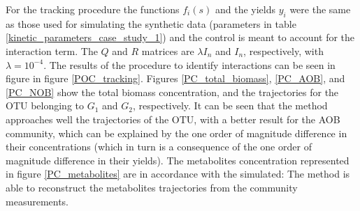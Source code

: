 \documentclass[3p,times]{article}
\begin{document}
 For the tracking procedure the functions $f_i(s)$ and the yields $y_i$ were the same as those used for simulating the synthetic data (parameters in table \ref{kinetic_parameters_case_study_1}) and the control is meant to account for the interaction term. The $Q$ and $R$ matrices are $\lambda I_n$ and $I_n$, respectively, with $\lambda = 10^{-4}$. The results of the procedure to identify interactions can be seen in figure in figure \ref{POC_tracking}. Figures \ref{PC_total_biomass}, \ref{PC_AOB}, and \ref{PC_NOB} show the total biomass concentration, and the trajectories for the OTU belonging to $G_1$ and $G_2$, respectively. It can be seen that the method approaches well the trajectories of the OTU, with a better result for the AOB community, which can be explained by the one order of magnitude difference in their concentrations (which in turn is a consequence of the one order of magnitude difference in their yields). The metabolites concentration represented in figure \ref{PC_metabolites} are in accordance with the simulated: The method is able to reconstruct the metabolites trajectories from the community measurements. 
\end{document}
